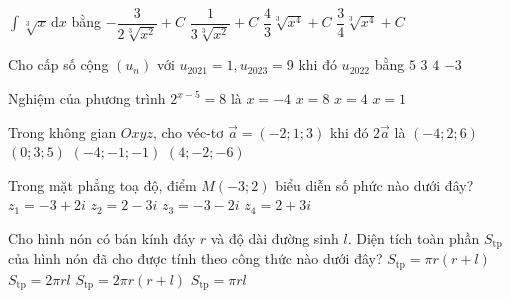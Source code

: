 \begin{ex}%
	$\displaystyle\int\limits\sqrt[3]{x}\mathrm{\,d}x$ bằng
	\choice
	{$-\dfrac{3}{2\sqrt[3]{x^2}}+C$}
	{$\dfrac{1}{3\sqrt[3]{x^2}}+C$}
	{$\dfrac{4}{3}\sqrt[3]{x^4}+C$}
	{\True $\dfrac{3}{4}\sqrt[3]{x^4}+C$}
\end{ex}
\begin{ex}%
	Cho cấp số cộng $(u_n)$ với $u_{2021}=1,u_{2023}=9$ khi đó  $u_{2022}$ bằng
	\choice
	{\True$5$}
	{$3$}
	{$4$}
	{$-3$}
\end{ex}
\begin{ex}%
	Nghiệm của phương trình $2^{x-5}=8$ là
	\choice
	{$x=-4$}
	{\True$x=8$}
	{$x=4$}
	{$x=1$}
\end{ex}
\begin{ex}%
	Trong không gian $Oxyz$, cho véc-tơ $\overrightarrow{a}=(-2;1;3)$ khi đó $2\overrightarrow{a}$ là
	\choice
	{\True $(-4;2;6)$}
	{$(0;3;5)$}
	{$(-4;-1;-1)$}
	{$(4;-2;-6)$}
\end{ex}


\begin{ex}%
	Trong mặt phẳng toạ độ, điểm $M(-3 ; 2)$ biểu diễn số phức nào dưới đây?
	\choice 
	{\True $z_1=-3+2i$}
	{$z_2=2-3i$}
	{$z_3=-3-2i$}
	{$z_4=2+3i$}
\end{ex}



\begin{ex}%
	Cho hình nón có bán kính đáy $r$ và độ dài đường sinh $l$. Diện tích toàn phần $S_{\text{tp}}$ của hình nón đã cho được tính theo công thức nào dưới đây?
	\choice 
	{\True $S_{\text{tp}}=\pi r(r+l)$}
	{$S_{\text{tp}}=2 \pi r l$}
	{$S_{\text{tp}}=2 \pi r(r+l)$}
	{$S_{\text{tp}}=\pi rl$}
\end{ex}



